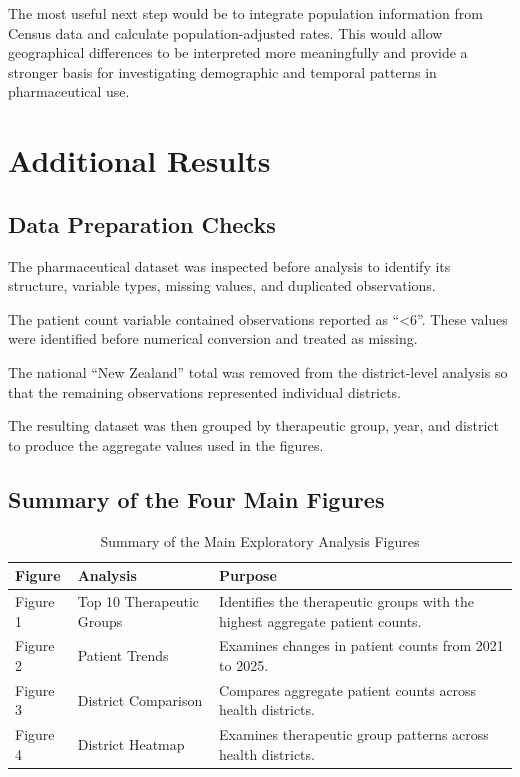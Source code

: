 \documentclass[11pt,a4paper]{report}
\begin{document}
The most useful next step would be to integrate population information from Census data and calculate population-adjusted rates. This would allow geographical differences to be interpreted more meaningfully and provide a stronger basis for investigating demographic and temporal patterns in pharmaceutical use.


\appendix

\chapter{Additional Results}

\section{Data Preparation Checks}

The pharmaceutical dataset was inspected before analysis to identify its structure, variable types, missing values, and duplicated observations.

The patient count variable contained observations reported as ``<6''. These values were identified before numerical conversion and treated as missing.

The national ``New Zealand'' total was removed from the district-level analysis so that the remaining observations represented individual districts.

The resulting dataset was then grouped by therapeutic group, year, and district to produce the aggregate values used in the figures.


\section{Summary of the Four Main Figures}

\begin{table}[H]
\centering
\caption{Summary of the Main Exploratory Analysis Figures}
\label{tab:figures}
\begin{tabular}{p{2cm}p{4cm}p{7cm}}
\toprule
\textbf{Figure} & \textbf{Analysis} & \textbf{Purpose} \\
\midrule
Figure 1 & Top 10 Therapeutic Groups & Identifies the therapeutic groups with the highest aggregate patient counts. \\
Figure 2 & Patient Trends & Examines changes in patient counts from 2021 to 2025. \\
Figure 3 & District Comparison & Compares aggregate patient counts across health districts. \\
Figure 4 & District Heatmap & Examines therapeutic group patterns across health districts. \\
\bottomrule
\end{tabular}
\end{table}
\end{document}
